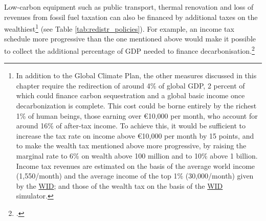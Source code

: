 \documentclass[a5paper,english,openany]{memoir}
\begin{document}
Low-carbon equipment  such as public transport, thermal renovation %
and loss of revenues from fossil fuel taxation %
can also be financed by additional taxes on the wealthiest\footnote{In addition to the Global Climate Plan, the other measures discussed in this chapter require the redirection of around 4\% %
of global GDP, 2 percent  %
of which could finance carbon sequestration and a global basic income once decarbonization is complete. %
This cost could be borne entirely by the richest 1\% of human beings, those earning over \euro{}10,000 per month, %
who account for around 16\% of after-tax income. To achieve this, it would be sufficient to increase the tax rate on income above \euro{}10,000 per month by 15 points, and to make the wealth tax mentioned above more progressive, by raising the marginal rate to 6\% on wealth above 100 million and to 10\% above 1 billion. Income tax revenues are estimated on the basis of the average world income (\textit{\texteuro{}}1,550/month) and the average income of the top 1\% (\textit{\texteuro{}}30,000/month) given by the \href{https://wid.world/data/}{WID}; and those of the wealth tax on the basis of the \href{https://wid.world/world-wealth-tax-simulator/}{WID} simulator.
} (see Table \ref{tab:redistr_policies}). 
For example, an income tax schedule more progressive than the one mentioned above would make it possible to collect the additional percentage of GDP needed to finance decarbonisation.\footnote{\citet{aie_net_2021}.} 
\end{document}

